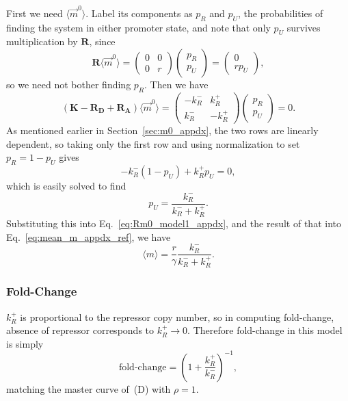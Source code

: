First we need $\langle\vec{m}^0\rangle$. Label its components as $p_R$ and
$p_U$, the probabilities of finding the system in either promoter state, and
note that only $p_U$ survives multiplication by $\mathbf{R}$, since
\begin{equation}
\mathbf{R} \langle\vec{m}^0\rangle
= \begin{pmatrix} 0 & 0 \\ 0 & r \end{pmatrix}
    \begin{pmatrix} p_R \\ p_U \end{pmatrix}
= \begin{pmatrix} 0 \\ r p_U \end{pmatrix},
\label{eq:Rm0_model1_appdx}
\end{equation}
so we need not bother finding $p_R$. Then we have
\begin{equation}
(\mathbf{K} - \mathbf{R_D} + \mathbf{R_A}) \langle\vec{m}^0\rangle
= \begin{pmatrix} -k_R^- & k_R^+ \\ k_R^- & -k_R^+ \end{pmatrix}
    \begin{pmatrix} p_R \\ p_U \end{pmatrix} = 0.
\label{eq:model1_m0_giver_appdx}
\end{equation}
As mentioned earlier in Section~\ref{sec:m0_appdx}, the two rows are linearly
dependent, so taking only the first row and using normalization to set $p_R =
1-p_U$ gives
\begin{equation}
-k_R^- (1-p_U) + k_R^+ p_U = 0,
\end{equation}
which is easily solved to find
\begin{equation}
p_U = \frac{k_R^-}{k_R^- + k_R^+}.
\end{equation}
Substituting this into Eq.~\ref{eq:Rm0_model1_appdx}, and the result of that
into Eq.~\ref{eq:mean_m_appdx_ref}, we have
\begin{equation}
\langle{m}\rangle = \frac{r}{\gamma} \frac{k_R^-}{k_R^- + k_R^+}.
\end{equation}

\subsubsection{Fold-Change}
$k_R^+$ is proportional to the repressor copy number, so in computing
fold-change, absence of repressor corresponds to $k_R^+\rightarrow0$. Therefore
fold-change in this model is simply
\begin{equation}
\text{fold-change} = \left(1 + \frac{k_R^+}{k_R^-}\right)^{-1},
\end{equation}
matching the master curve of~(D) with $\rho=1$.

